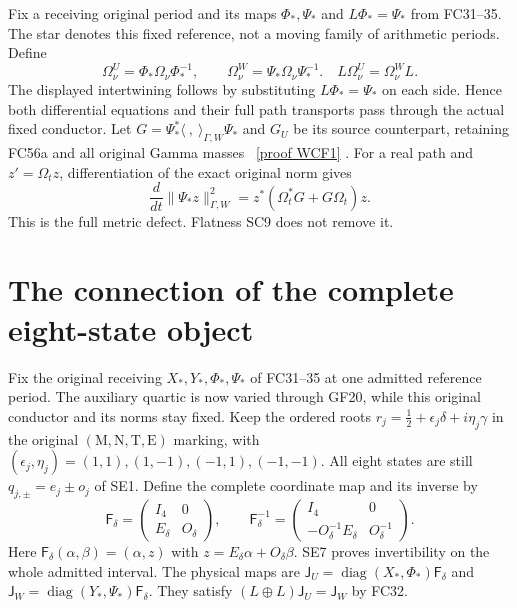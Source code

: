 \documentclass[11pt]{article}
\begin{document}
Fix a receiving original period and its maps $\Phi_*,\Psi_*$ and
$L\Phi_*=\Psi_*$ from FC31--35. The star denotes this fixed reference,
not a moving family of arithmetic periods. Define
\[
 \Omega^U_\nu=\Phi_*\Omega_\nu\Phi_*^{-1},\qquad
 \Omega^W_\nu=\Psi_*\Omega_\nu\Psi_*^{-1}.
 \quad L\Omega^U_\nu=\Omega^W_\nu L. \tag{SC11}
\]
The displayed intertwining follows by substituting $L\Phi_*=\Psi_*$
on each side. Hence both differential equations and their full path
transports pass through the actual fixed conductor. Let
$G=\Psi_*^*\langle\ ,\ \rangle_{\Gamma,W}\Psi_*$ and $G_U$ be its
source counterpart, retaining FC56a and all original Gamma masses
\cite{WCF}%
~\href{https://github.com/KokunoYumeto/zeta-function-research-reader/blob/5992ad50c0f2a06921f1fcaded7b4e38097c0739/workbenches/splitzero-tandem/continuations/20260920-original-kernel-mixed-determinants/providers/WEIGHTED_CONDUCTOR_FORWARD.tex\#L28}{[proof WCF1]}%
{}. For a real path and $z'=\Omega_tz$, differentiation of
the exact original norm gives
\[
 \frac{d}{dt}\|\Psi_*z\|_{\Gamma,W}^2
       =z^*(\Omega_t^*G+G\Omega_t)z. \tag{SC12}
\]
This is the full metric defect. Flatness SC9 does not remove it.

\section{The connection of the complete eight-state object}
Fix the original receiving $X_*,Y_*,\Phi_*,\Psi_*$ of FC31--35 at
one admitted reference period. The auxiliary quartic is now varied
through GF20, while this original conductor and its norms stay fixed.
Keep the ordered roots
$r_j=\tfrac12+\epsilon_j\delta+i\eta_j\gamma$ in the original
$(\mathrm M,\mathrm N,\mathrm T,\mathrm E)$ marking, with
$(\epsilon_j,\eta_j)=(1,1),(1,-1),(-1,1),(-1,-1)$.
All eight states are still $q_{j,\pm}=e_j\pm o_j$ of SE1.
Define the complete coordinate map and its inverse by
\[
 \mathsf F_\delta=
 \begin{pmatrix}I_4&0\\ E_\delta&O_\delta\end{pmatrix},\qquad
 \mathsf F_\delta^{-1}=
 \begin{pmatrix}I_4&0\\-O_\delta^{-1}E_\delta&O_\delta^{-1}\end{pmatrix}.
 \tag{TC1}
\]
Here $\mathsf F_\delta(\alpha,\beta)=(\alpha,z)$ with
$z=E_\delta\alpha+O_\delta\beta$. SE7 proves invertibility on the
whole admitted interval. The physical maps are
$\mathsf J_U=\operatorname{diag}(X_*,\Phi_*)\mathsf F_\delta$ and
$\mathsf J_W=\operatorname{diag}(Y_*,\Psi_*)\mathsf F_\delta$.
They satisfy $(L\oplus L)\mathsf J_U=\mathsf J_W$ by FC32.
\end{document}
